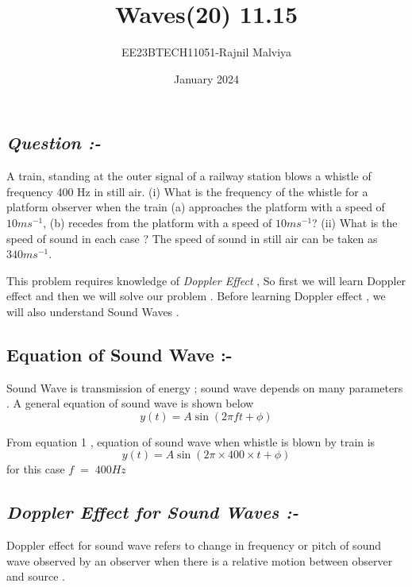 \documentclass[journal,12pt,twocolumn]{IEEEtran}
\theoremstyle{remark}
\begin{document}
\title{Waves(20) 11.15}
\author{EE23BTECH11051-Rajnil Malviya}
\date{January 2024}



\maketitle

\subsection*{\textit{Question :-}}
A train, standing at the outer signal of a railway station blows a whistle of frequency
400 Hz in still air. (i) What is the frequency of the whistle for a platform observer
when the train (a) approaches the platform with a speed of $10 ms^{-1} $, (b) recedes
from the platform with a speed of $10 ms^{-1} $? (ii) What is the speed of sound in each
case ? The speed of sound in still air can be taken as $340 ms^{-1} $.

\bigskip
 This problem requires knowledge of \textit{Doppler Effect} , So first we will learn Doppler effect and then we will solve our problem . Before learning Doppler effect , we will also understand Sound Waves .
 \begin{table}[h!]
   
        
       
    \end{table}
\subsection*{Equation of Sound Wave :-}
Sound Wave is transmission of energy ; sound wave depends on many parameters . A general equation of sound wave is shown below 
\begin{equation} \label{eq1}
y(t) = A\sin{( 2 \pi ft + \phi )}
\end{equation}

 \begin{table}[h!]
   
        
       
    \end{table}

From equation 1 , equation of sound wave when whistle is blown by
train is 
\newpage
$$y(t) = A\sin{( 2 \pi \times400\times t + \phi )} $$ 
\;\;\;\;\;\;\;\;\;\;\;\;\;\;\;\;\;\;\;\;for this case $f\;=\;400Hz$\\
\subsection*{\textit{Doppler Effect for Sound Waves :-}}
Doppler effect for sound wave refers to change in frequency or pitch of sound wave observed by an observer when there is a relative motion between observer and source .
\end{document}

